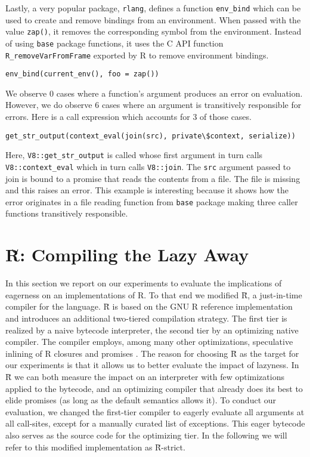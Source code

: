 \documentclass[review,nonacm,screen,acmsmall,anonymous=true]{acmart}
\newcommand{\authorcomment}[3]{}
\newcommand{\AG}[1]{\authorcomment{orange}{AG}{#1}}
\newcommand{\code}[1]{\lstinline |#1|\xspace}
\renewcommand{\Rsh}{{\sf\u R}\xspace}
\newcommand{\Rshstrict}{{\sf\u R-strict}\xspace}
\begin{document}
Lastly, a very popular package, \code{rlang}, defines a function \code{env_bind}
which can be used to create and remove bindings from an environment. When passed
with the value \code{zap()}, it removes the corresponding symbol from the
environment. Instead of using \code{base} package functions, it uses the C API
function \code{R_removeVarFromFrame} exported by R to remove environment
bindings.
%
\begin{lstlisting}
env_bind(current_env(), foo = zap())
\end{lstlisting}
%
We observe 0 cases where a function's argument produces an error on evaluation.
However, we do observe 6 cases where an argument is transitively responsible for
errors. Here is a call expression which accounts for 3 of those cases.
%
\begin{lstlisting}
get_str_output(context_eval(join(src), private\$context, serialize))
\end{lstlisting}
%
Here, \code{V8::get_str_output} is called whose first argument in turn calls
\code{V8::context_eval} which in turn calls \code{V8::join}. The \code{src}
argument passed to join is bound to a promise that reads the contents from a
file. The file is missing and this raises an error. This example is interesting
because it shows how the error originates in a file reading function from
\code{base} package making three caller functions transitively responsible.

\AG{TODO: appeal to intuition for lookups since the actual examples are hard to decipher.}

\section{\Rsh: Compiling the Lazy Away}\label{sec:rsh}

In this section we report on our experiments to evaluate the implications of
eagerness on an implementations of R. To that end we modified \Rsh, a just-in-time
compiler for the language. \Rsh is based on the GNU R reference implementation
and introduces an additional two-tiered compilation strategy. The
first tier is realized by a naive bytecode interpreter, the second tier
by an optimizing native compiler. The compiler employs, among many other
optimizations, speculative inlining of R closures and promises \citep{dls19,
oopsla20c}.
The reason for choosing \Rsh as the target for our
experiments is that it allows us to better evaluate the impact of lazyness. In
\Rsh we can both measure the impact on an interpreter with few optimizations
applied to the bytecode, and an optimizing compiler that already does its best
to elide promises (as long as the default semantics allows it).
To conduct our evaluation, we changed the first-tier
compiler to eagerly evaluate all arguments at all call-sites, except for a
manually curated list of exceptions. This eager bytecode also serves as the source
code for the optimizing tier. In the following we will refer
to this modified implementation as \Rshstrict.
\end{document}
